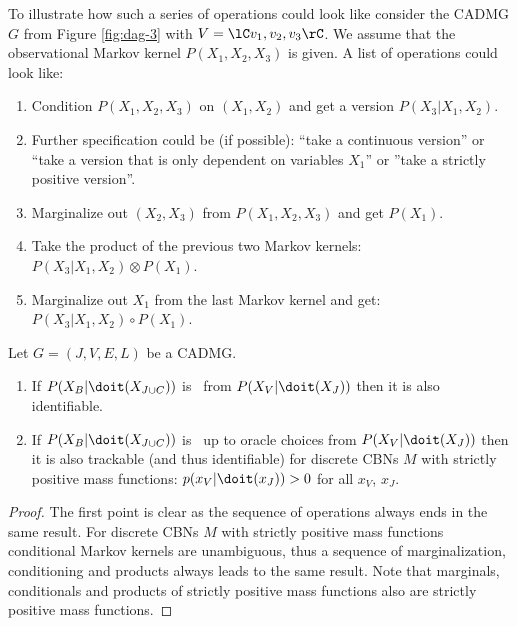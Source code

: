 \begin{Eg}
    To illustrate how such a series of operations could look like
    consider the CADMG $G$ from Figure \ref{fig:dag-3} with $V=\lC v_1,v_2,v_3 \rC$. 
    We assume that the observational Markov kernel $P(X_1,X_2,X_3)$ is given.
    A list of operations could look like:
    \begin{enumerate}
        \item Condition $P(X_1,X_2,X_3)$ on $(X_1,X_2)$ and get a version $P(X_3|X_1,X_2)$. 
        \item[] Further specification could be (if possible): ``take a continuous version'' or ``take a version that is only dependent on variables $X_1$'' or ''take a strictly positive version''.
        \item Marginalize out $(X_2,X_3)$ from $P(X_1,X_2,X_3)$ and get $P(X_1)$.
        \item Take the product of the previous two Markov kernels: $P(X_3|X_1,X_2) \otimes P(X_1)$.
        \item Marginalize out $X_1$ from the last Markov kernel and get: $P(X_3|X_1,X_2) \circ P(X_1)$.
    \end{enumerate}
\end{Eg}

\begin{Lem}
    Let $G=(J,V,E,L)$ be a CADMG.
    \begin{enumerate} 
        \item If $P(X_B|\doit(X_{J \cup C}))$ is \trackable\ from $P(X_V|\doit(X_J))$ then it is also identifiable.
        \item If $P(X_B|\doit(X_{J \cup C}))$ is \trackable\ up to oracle choices from $P(X_V|\doit(X_J))$ 
            then it is also trackable (and thus identifiable) for discrete CBNs $M$ with strictly positive mass functions: 
    $p(x_V|\doit(x_J))>0$ for all $x_V$, $x_J$.
    \end{enumerate}
    \begin{proof}
        The first point is clear as the sequence of operations always ends in the same result.
        For discrete CBNs $M$ with strictly positive mass functions conditional Markov kernels are unambiguous, thus a sequence
        of marginalization, conditioning and products always leads to the same result.
        Note that marginals, conditionals and products of strictly positive mass functions also are strictly positive mass functions.
    \end{proof}
\end{Lem}



